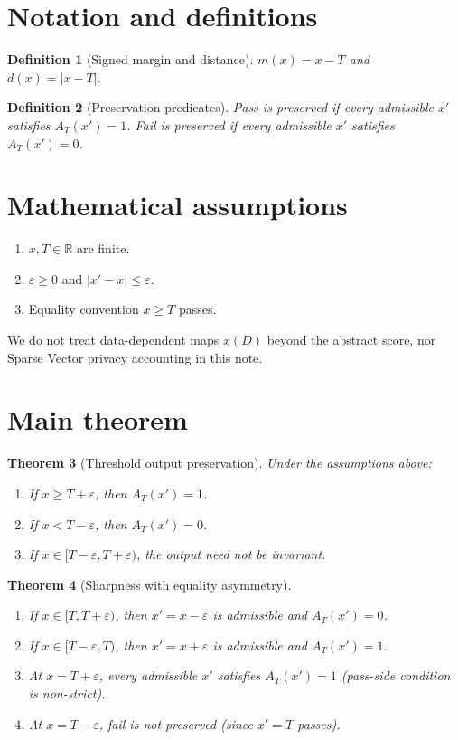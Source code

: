\documentclass[11pt]{article}
\newtheorem{theorem}{Theorem}
\newtheorem{definition}[theorem]{Definition}
\begin{document}
\section{Notation and definitions}
\begin{definition}[Signed margin and distance]
\(m(x)=x-T\) and \(d(x)=\lvert x-T\rvert\).
\end{definition}
\begin{definition}[Preservation predicates]
Pass is preserved if every admissible \(x'\) satisfies \(A_T(x')=1\).
Fail is preserved if every admissible \(x'\) satisfies \(A_T(x')=0\).
\end{definition}

\section{Mathematical assumptions}
\begin{enumerate}
\item \(x,T\in\mathbb{R}\) are finite.
\item \(\varepsilon\ge 0\) and \(\lvert x'-x\rvert\le\varepsilon\).
\item Equality convention \(x\ge T\) passes.
\end{enumerate}
We do not treat data-dependent maps \(x(D)\) beyond the abstract score,
nor Sparse Vector privacy accounting in this note.

\section{Main theorem}
\begin{theorem}[Threshold output preservation]\label{thm:main}
Under the assumptions above:
\begin{enumerate}
\item If \(x\ge T+\varepsilon\), then \(A_T(x')=1\).
\item If \(x<T-\varepsilon\), then \(A_T(x')=0\).
\item If \(x\in[T-\varepsilon,T+\varepsilon)\), the output need not be invariant.
\end{enumerate}
\end{theorem}

\begin{theorem}[Sharpness with equality asymmetry]\label{thm:sharp}
\begin{enumerate}
\item If \(x\in[T,T+\varepsilon)\), then \(x'=x-\varepsilon\) is admissible and
\(A_T(x')=0\).
\item If \(x\in[T-\varepsilon,T)\), then \(x'=x+\varepsilon\) is admissible and
\(A_T(x')=1\).
\item At \(x=T+\varepsilon\), every admissible \(x'\) satisfies \(A_T(x')=1\)
(pass-side condition is non-strict).
\item At \(x=T-\varepsilon\), fail is \emph{not} preserved (since \(x'=T\) passes).
\end{enumerate}
\end{theorem}
\end{document}
